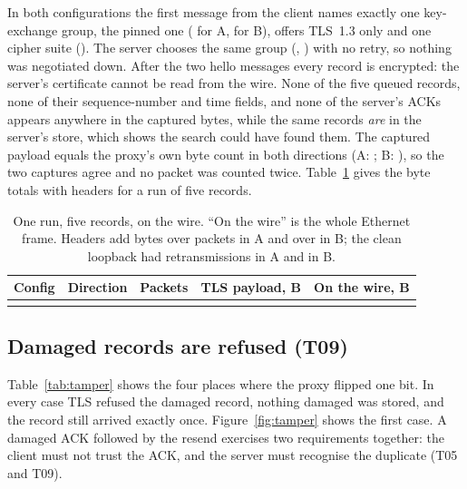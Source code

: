 \documentclass[11pt,a4paper]{article}
\begin{document}
In both configurations the first message from the client names exactly one key-exchange group, the
pinned one (\texttt{\WireAGroups} for A, \texttt{\WireBGroups} for B), offers TLS~1.3 only and one cipher
suite (\texttt{\WireASuite}). The server chooses the same group (\texttt{\WireAChosen},
\texttt{\WireBChosen}) with no retry, so nothing was negotiated down. After the two hello messages
every record is encrypted: the server's certificate cannot be read from the wire. None of the five
queued records, none of their sequence-number and time fields, and none of the server's ACKs appears
anywhere in the captured bytes, while the same records \emph{are} in the server's store, which shows
the search could have found them. The captured payload equals the proxy's own byte count in both
directions (A: \WireAAgree; B: \WireBAgree), so the two captures agree and no packet was counted twice.
Table~\ref{tab:wire} gives the byte totals with headers for a run of five records.

\begin{table}[!htbp]
\centering
\caption{One run, five records, on the wire. ``On the wire'' is the whole Ethernet frame. Headers add
\WireAOver{} bytes over \WireAPkts{} packets in A and \WireBOver{} over \WireBPkts{} in B;
the clean loopback had \WireARetx{} retransmissions in A and \WireBRetx{} in B.}
\label{tab:wire}
\small
\begin{tabular}{@{}llrrr@{}}
\toprule
Config & Direction & Packets & TLS payload, B & On the wire, B \\
\midrule
\\
\bottomrule
\end{tabular}
\end{table}

\subsection{Damaged records are refused (T09)}

Table~\ref{tab:tamper} shows the four places where the proxy flipped one bit. In every case TLS refused the
damaged record, nothing damaged was stored, and the record still arrived exactly once. Figure~\ref{fig:tamper}
shows the first case. A damaged ACK followed by the resend exercises two requirements together: the
client must not trust the ACK, and the server must recognise the duplicate (T05 and T09).
\end{document}
